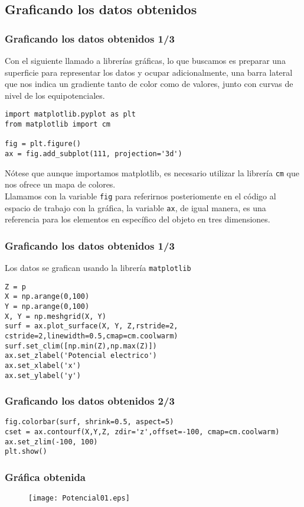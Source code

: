 \subsection{Graficando los datos obtenidos}
\begin{frame}[fragile]
\frametitle{Graficando los datos obtenidos 1/3}
Con el siguiente llamado a librerías gráficas, lo que buscamos es preparar una superficie para representar los datos y ocupar adicionalmente, una barra lateral que nos indica un gradiente tanto de color como de valores, junto con curvas de nivel de los equipotenciales.
\begin{lstlisting}
import matplotlib.pyplot as plt
from matplotlib import cm

fig = plt.figure()
ax = fig.add_subplot(111, projection='3d')
\end{lstlisting}
\end{frame}
\begin{frame}
Nótese que aunque importamos matplotlib, es necesario utilizar la librería \texttt{cm} que nos ofrece un mapa de colores.
\\
\medskip
Llamamos con la variable \texttt{fig} para referirnos posteriomente en el código al espacio de trabajo con la gráfica, la variable \texttt{ax}, de igual manera, es una referencia para los elementos en específico del objeto en tres dimensiones.
\end{frame}
\begin{frame}[fragile]
\frametitle{Graficando los datos obtenidos 1/3}
Los datos se grafican usando la librería \texttt{matplotlib}
\begin{lstlisting}
Z = p
X = np.arange(0,100)
Y = np.arange(0,100)
X, Y = np.meshgrid(X, Y)
surf = ax.plot_surface(X, Y, Z,rstride=2, cstride=2,linewidth=0.5,cmap=cm.coolwarm)
surf.set_clim([np.min(Z),np.max(Z)])
ax.set_zlabel('Potencial electrico')
ax.set_xlabel('x')
ax.set_ylabel('y')
\end{lstlisting}
\end{frame}
\begin{frame}[fragile]
\frametitle{Graficando los datos obtenidos 2/3}
\begin{lstlisting}
fig.colorbar(surf, shrink=0.5, aspect=5)
cset = ax.contourf(X,Y,Z, zdir='z',offset=-100, cmap=cm.coolwarm)
ax.set_zlim(-100, 100)
plt.show()
\end{lstlisting}
\end{frame}
\begin{frame}[fragile]
\frametitle{Gráfica obtenida}
\begin{figure}
	\centering
	\texttt{[image: Potencial01.eps]} 
\end{figure}
\end{frame}
